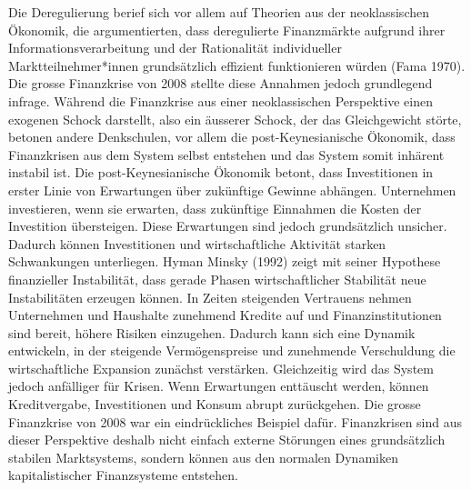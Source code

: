 \documentclass[
  nswissgerman,
  a4paper,
  DIV=11,
  numbers=noendperiod,
  oneside,
  openany]{scrreprt}
\begin{document}
Die Deregulierung berief sich vor allem auf Theorien aus der
neoklassischen Ökonomik, die argumentierten, dass deregulierte
Finanzmärkte aufgrund ihrer Informationsverarbeitung und der
Rationalität individueller Marktteilnehmer*innen grundsätzlich effizient
funktionieren würden (Fama 1970). Die grosse Finanzkrise von 2008
stellte diese Annahmen jedoch grundlegend infrage. Während die
Finanzkrise aus einer neoklassischen Perspektive einen exogenen Schock
darstellt, also ein äusserer Schock, der das Gleichgewicht störte,
betonen andere Denkschulen, vor allem die post-Keynesianische Ökonomik,
dass Finanzkrisen aus dem System selbst entstehen und das System somit
inhärent instabil ist. Die post-Keynesianische Ökonomik betont, dass
Investitionen in erster Linie von Erwartungen über zukünftige Gewinne
abhängen. Unternehmen investieren, wenn sie erwarten, dass zukünftige
Einnahmen die Kosten der Investition übersteigen. Diese Erwartungen sind
jedoch grundsätzlich unsicher. Dadurch können Investitionen und
wirtschaftliche Aktivität starken Schwankungen unterliegen. Hyman Minsky
(1992) zeigt mit seiner Hypothese finanzieller Instabilität, dass gerade
Phasen wirtschaftlicher Stabilität neue Instabilitäten erzeugen können.
In Zeiten steigenden Vertrauens nehmen Unternehmen und Haushalte
zunehmend Kredite auf und Finanzinstitutionen sind bereit, höhere
Risiken einzugehen. Dadurch kann sich eine Dynamik entwickeln, in der
steigende Vermögenspreise und zunehmende Verschuldung die
wirtschaftliche Expansion zunächst verstärken. Gleichzeitig wird das
System jedoch anfälliger für Krisen. Wenn Erwartungen enttäuscht werden,
können Kreditvergabe, Investitionen und Konsum abrupt zurückgehen. Die
grosse Finanzkrise von 2008 war ein eindrückliches Beispiel dafür.
Finanzkrisen sind aus dieser Perspektive deshalb nicht einfach externe
Störungen eines grundsätzlich stabilen Marktsystems, sondern können aus
den normalen Dynamiken kapitalistischer Finanzsysteme entstehen.
\end{document}
